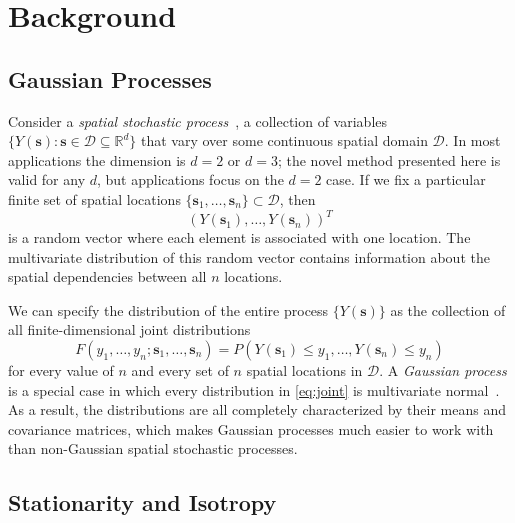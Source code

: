 \chapter{Background} \label{chapter1:Background}

\section{\sloppy Gaussian Processes}

Consider a \emph{spatial stochastic process}~\cite{gelfand2010handbook}, a collection of variables $\{Y(\bm{s}): \bm{s} \in \mathcal{D} \subseteq \mathbb{R}^d\}$ that vary over some continuous spatial domain $\mathcal{D}$. In most applications the dimension is $d = 2$ or $d = 3$; the novel method presented here is valid for any $d$, but applications focus on the $d = 2$ case. If we fix a particular finite set of spatial locations $\{\bm{s}_1, \dots, \bm{s}_n\} \subset \mathcal{D}$, then
\begin{equation}
(Y(\bm{s}_1), \dots, Y(\bm{s}_n))^T
\end{equation}
is a random vector where each element is associated with one location. The multivariate distribution of this random vector contains information about the spatial dependencies between all $n$ locations.

We can specify the distribution of the entire process $\{Y(\bm{s})\}$ as the collection of all finite-dimensional joint distributions
\begin{equation} \label{eq:joint}
F(y_1, \dots, y_n; \bm{s}_1, \dots, \bm{s}_n) = P(Y(\bm{s}_1) \leq y_1, \dots, Y(\bm{s}_n) \leq y_n)
\end{equation}
for every value of $n$ and every set of $n$ spatial locations in $\mathcal{D}$. A \emph{Gaussian process} is a special case in which every distribution in \eqref{eq:joint} is multivariate normal~\cite{gelfand2010handbook}. As a result, the distributions are all completely characterized by their means and covariance matrices, which makes Gaussian processes much easier to work with than non-Gaussian spatial stochastic processes.


\section{Stationarity and Isotropy} %
\label{sec:stationarity_and_isotropy}


